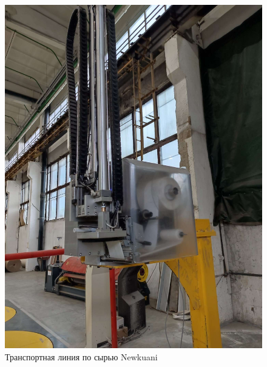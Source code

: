 \begin{figure}
\begin{center}
  \includegraphics[height=0.4\textheight, width=\textwidth, keepaspectratio]{Pics/d_Newkuani_6.JPEG}
\end{center}
  \caption{Транспортная линия по сырью Newkuani}
  \label{pic:d_Newkuani_6}
\end{figure}

